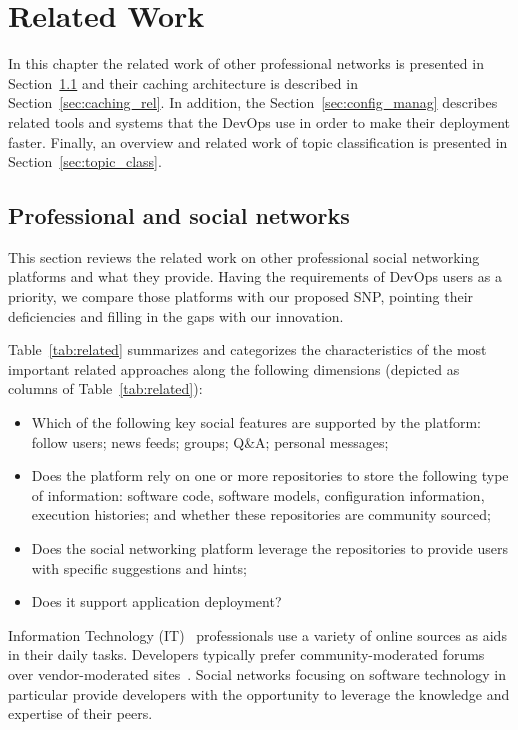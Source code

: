 \chapter{Related Work}
\label{sec:related}
In this chapter the related work of other professional networks is presented in Section~\ref{sec:networks_rel} and their caching architecture is described in Section~\ref{sec:caching_rel}. In addition, the Section~\ref{sec:config_manag} describes related tools and systems that the DevOps use in order to make their deployment faster. Finally, an overview and related work of topic classification is presented in Section~\ref{sec:topic_class}. 

\section{Professional and social networks} 
\label{sec:networks_rel}
This section reviews the related work on other professional social networking platforms and what they provide. Having the requirements of DevOps users as a priority, we compare those platforms with our proposed SNP, pointing their deficiencies and filling in the gaps with our innovation. 

Table~\ref{tab:related} summarizes
and categorizes the characteristics of the most important related approaches along the following dimensions
(depicted as columns of Table~\ref{tab:related}): 
\begin{itemize}
\item Which of the following key social features are supported by the platform: follow
users; news feeds; groups; Q\&A; personal messages;
\item Does the platform rely on one or more repositories
to store the following type of information: software code,
software models, configuration information, execution
histories; and whether these repositories are community sourced;
\item Does the social networking platform leverage
the repositories to provide users with specific suggestions
and hints; 
\item Does it support application deployment?
\end{itemize}

Information Technology (IT)~\cite{jorgenson1999information} professionals use a variety of online sources as aids in their daily tasks. Developers typically prefer community-moderated forums over vendor-moderated sites~\cite{evans-date}. Social networks focusing on software technology in particular provide developers with the opportunity to leverage the knowledge and expertise of their peers.
 
